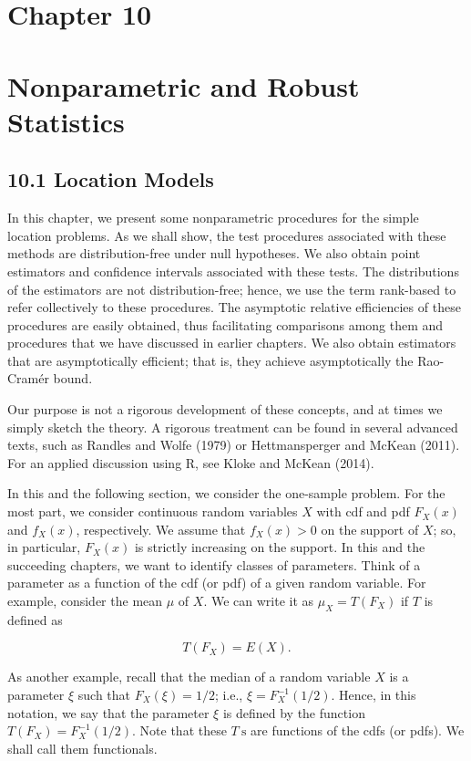 \section*{Chapter 10}
\section*{Nonparametric and Robust Statistics}
\subsection*{10.1 Location Models}
In this chapter, we present some nonparametric procedures for the simple location problems. As we shall show, the test procedures associated with these methods are distribution-free under null hypotheses. We also obtain point estimators and confidence intervals associated with these tests. The distributions of the estimators are not distribution-free; hence, we use the term rank-based to refer collectively to these procedures. The asymptotic relative efficiencies of these procedures are easily obtained, thus facilitating comparisons among them and procedures that we have discussed in earlier chapters. We also obtain estimators that are asymptotically efficient; that is, they achieve asymptotically the Rao-Cramér bound.

Our purpose is not a rigorous development of these concepts, and at times we simply sketch the theory. A rigorous treatment can be found in several advanced texts, such as Randles and Wolfe (1979) or Hettmansperger and McKean (2011). For an applied discussion using R, see Kloke and McKean (2014).

In this and the following section, we consider the one-sample problem. For the most part, we consider continuous random variables $X$ with cdf and pdf $F_{X}(x)$ and $f_{X}(x)$, respectively. We assume that $f_{X}(x)>0$ on the support of $X$; so, in particular, $F_{X}(x)$ is strictly increasing on the support. In this and the succeeding chapters, we want to identify classes of parameters. Think of a parameter as a function of the cdf (or pdf) of a given random variable. For example, consider the mean $\mu$ of $X$. We can write it as $\mu_{X}=T\left(F_{X}\right)$ if $T$ is defined as

$$
T\left(F_{X}\right)=E(X) .
$$

As another example, recall that the median of a random variable $X$ is a parameter $\xi$ such that $F_{X}(\xi)=1 / 2$; i.e., $\xi=F_{X}^{-1}(1 / 2)$. Hence, in this notation, we say that the parameter $\xi$ is defined by the function $T\left(F_{X}\right)=F_{X}^{-1}(1 / 2)$. Note that these $T \mathrm{~s}$ are functions of the cdfs (or pdfs). We shall call them functionals.

